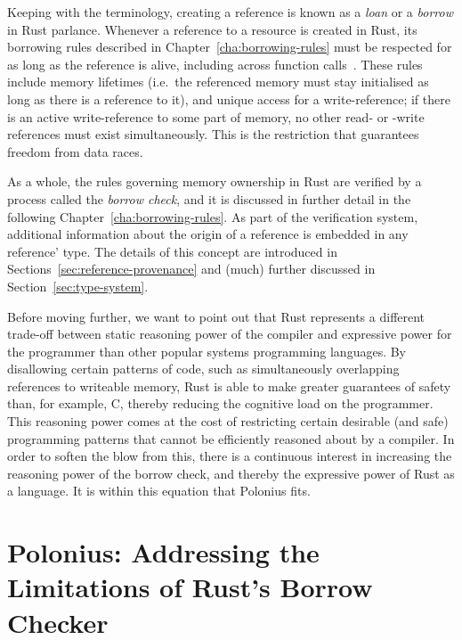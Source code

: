 \documentclass[11pt,a4paper,twoside,openany]{report}
\begin{document}
Keeping with the terminology, creating a reference is known as a \textit{loan}
or a \textit{borrow} in Rust parlance. Whenever a reference to a resource is
created in Rust, its borrowing rules described in
Chapter~\ref{cha:borrowing-rules} must be respected for as long as the reference
is alive, including across function calls~\cite{nichols_rust_nodate}. These
rules include memory lifetimes (i.e.\ the referenced memory must stay initialised
as long as there is a reference to it), and unique access for a write-reference;
if there is an active write-reference to some part of memory, no other read- or
-write references must exist simultaneously. This is the restriction that
guarantees freedom from data races.

As a whole, the rules governing memory ownership in Rust are verified by a
process called the \textit{borrow check}, and it is discussed in further detail
in the following Chapter~\ref{cha:borrowing-rules}. As part of the verification
system, additional information about the origin of a reference is embedded in
any reference' type. The details of this concept are introduced in
Sections~\ref{sec:reference-provenance} and (much) further discussed in
Section~\ref{sec:type-system}.

Before moving further, we want to point out that Rust represents a different
trade-off between static reasoning power of the compiler and expressive power
for the programmer than other popular systems programming languages. By
disallowing certain patterns of code, such as simultaneously overlapping
references to writeable memory, Rust is able to make greater guarantees of
safety than, for example, C, thereby reducing the cognitive load on the
programmer. This reasoning power comes at the cost of restricting certain
desirable (and safe) programming patterns that cannot be efficiently reasoned
about by a compiler. In order to soften the blow from this, there is a
continuous interest in increasing the reasoning power of the borrow check, and
thereby the expressive power of Rust as a language. It is within this equation
that Polonius fits.

\section{Polonius: Addressing the Limitations of Rust's Borrow
  Checker}\label{sec:limitations}
\end{document}
